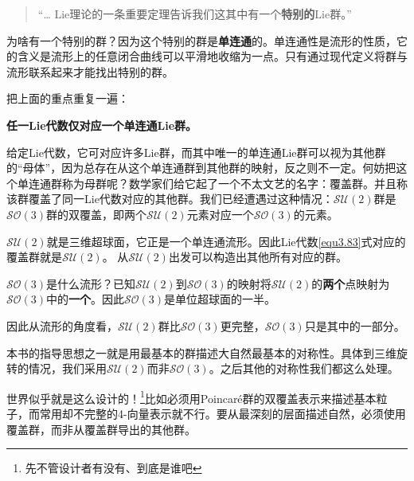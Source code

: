 \begin{quote}
“… Lie理论的一条重要定理告诉我们这其中有一个{\bf 特别的}Lie群。”
\end{quote}

为啥有一个特别的群？因为这个特别的群是{\bf 单连通}的。单连通性是流形的性质，它的含义是流形上的任意闭合曲线可以平滑地收缩为一点。只有通过现代定义将群与流形联系起来才能找出特别的群。

把上面的重点重复一遍：

{\bf 任一Lie代数仅对应一个单连通Lie群。}

给定Lie代数，它可对应许多Lie群，而其中唯一的单连通Lie群可以视为其他群的“母体”，因为总存在从这个单连通群到其他群的映射，反之则不一定。何妨把这个单连通群称为母群呢？数学家们给它起了一个不太文艺的名字：覆盖群。并且称该群覆盖了同一Lie代数对应的其他群。我们已经遭遇过这种情况：$\mathcal{SU}(2)$群是$\mathcal{SO}(3)$群的双覆盖，即两个$\mathcal{SU}(2)$元素对应一个$\mathcal{SO}(3)$的元素。

$\mathcal{SU}(2)$就是三维超球面，它正是一个单连通流形。因此Lie代数\eqref{equ3.83}式对应的覆盖群就是$\mathcal{SU}(2)$。 从$\mathcal{SU}(2)$出发可以构造出其他所有对应的群。

$\mathcal{SO}(3)$是什么流形？已知$\mathcal{SU}(2)$到$\mathcal{SO}(3)$的映射将$\mathcal{SU}(2)$的{\bf 两个}点映射为$\mathcal{SO}(3)$中的{\bf 一个}。因此$\mathcal{SO}(3)$是单位超球面的一半。


因此从流形的角度看，$\mathcal{SU}(2)$群比$\mathcal{SO}(3)$更完整，$\mathcal{SO}(3)$只是其中的一部分。

本书的指导思想之一就是用最基本的群描述大自然最基本的对称性。具体到三维旋转的情况，我们采用$\mathcal{SU}(2)$而非$\mathcal{SO}(3)$。之后其他的对称性我们都这么处理。

世界似乎就是这么设计的！\footnote{先不管设计者有没有、到底是谁吧}比如必须用Poincar\'e群的双覆盖表示来描述基本粒子，而常用却不完整的4-向量表示就不行。要从最深刻的层面描述自然，必须使用覆盖群，而非从覆盖群导出的其他群。

